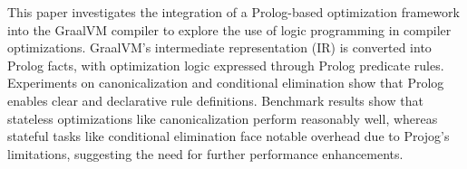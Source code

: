 This paper investigates the integration of a Prolog-based optimization framework into the GraalVM compiler to explore the use of logic programming in compiler optimizations. GraalVM’s intermediate representation (IR) is converted into Prolog facts, with optimization logic expressed through Prolog predicate rules. Experiments on canonicalization and conditional elimination show that Prolog enables clear and declarative rule definitions. Benchmark results show that stateless optimizations like canonicalization perform reasonably well, whereas stateful tasks like conditional elimination face notable overhead due to Projog’s limitations, suggesting the need for further performance enhancements.